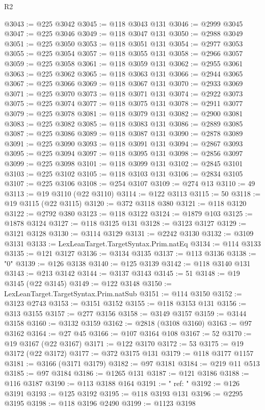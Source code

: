 \begin{lexlean}{R2}
\begin{coremodule}
@3043 := @225 @3042
@3045 := @118 @3043 @131
@3046 := @2999 @3045
@3047 := @225 @3046
@3049 := @118 @3047 @131
@3050 := @2988 @3049
@3051 := @225 @3050
@3053 := @118 @3051 @131
@3054 := @2977 @3053
@3055 := @225 @3054
@3057 := @118 @3055 @131
@3058 := @2966 @3057
@3059 := @225 @3058
@3061 := @118 @3059 @131
@3062 := @2955 @3061
@3063 := @225 @3062
@3065 := @118 @3063 @131
@3066 := @2944 @3065
@3067 := @225 @3066
@3069 := @118 @3067 @131
@3070 := @2933 @3069
@3071 := @225 @3070
@3073 := @118 @3071 @131
@3074 := @2922 @3073
@3075 := @225 @3074
@3077 := @118 @3075 @131
@3078 := @2911 @3077
@3079 := @225 @3078
@3081 := @118 @3079 @131
@3082 := @2900 @3081
@3083 := @225 @3082
@3085 := @118 @3083 @131
@3086 := @2889 @3085
@3087 := @225 @3086
@3089 := @118 @3087 @131
@3090 := @2878 @3089
@3091 := @225 @3090
@3093 := @118 @3091 @131
@3094 := @2867 @3093
@3095 := @225 @3094
@3097 := @118 @3095 @131
@3098 := @2856 @3097
@3099 := @225 @3098
@3101 := @118 @3099 @131
@3102 := @2845 @3101
@3103 := @225 @3102
@3105 := @118 @3103 @131
@3106 := @2834 @3105
@3107 := @225 @3106
@3108 := @254 @3107
@3109 := @274 @13
@3110 := 49
@3113 := @19 @3110 (@22 @3110)
@3114 := @122 @3113
@3115 := 50
@3118 := @19 @3115 (@22 @3115)
@3120 := @372 @3118 @380
@3121 := @118 @3120
@3122 := @2792 @380
@3123 := @118 @3122
@3124 := @1879 @103
@3125 := @1878 @3124
@3127 := @118 @3125 @131
@3128 := @3123 @3127
@3129 := @3121 @3128
@3130 := @3114 @3129
@3131 := @2242 @3130
@3132 := @3109 @3131
@3133 := LexLeanTarget.TargetSyntax.Prim.natEq
@3134 := @114 @3133
@3135 := @121 @3127
@3136 := @3134 @3135
@3137 := @113 @3136
@3138 := "0"
@3139 := @126 @3138
@3140 := @125 @3139
@3142 := @118 @3140 @131
@3143 := @213 @3142
@3144 := @3137 @3143
@3145 := 51
@3148 := @19 @3145 (@22 @3145)
@3149 := @122 @3148
@3150 := LexLeanTarget.TargetSyntax.Prim.natSub
@3151 := @114 @3150
@3152 := @3123 @2743
@3153 := @3151 @3152
@3155 := @118 @3153 @131
@3156 := @313 @3155
@3157 := @277 @3156
@3158 := @3149 @3157
@3159 := @3144 @3158
@3160 := @3132 @3159
@3162 := @2818 (@3108 @3160)
@3163 := @97 @3162
@3164 := @27 @45
@3166 := @107 @3164 @108
@3167 := 52
@3170 := @19 @3167 (@22 @3167)
@3171 := @122 @3170
@3172 := 53
@3175 := @19 @3172 (@22 @3172)
@3177 := @372 @3175 @131
@3179 := @118 @3177 @1157
@3181 := @3166 (@3171 @3179)
@3182 := @97 @3181
@3184 := @219 @11 @513
@3185 := @97 @3184
@3186 := @1265 @131
@3187 := @121 @3186
@3188 := @116 @3187
@3190 := @113 @3188 @164
@3191 := "          ref: "
@3192 := @126 @3191
@3193 := @125 @3192
@3195 := @118 @3193 @131
@3196 := @2295 @3195
@3198 := @118 @3196 @2490
@3199 := @1123 @3198

\end{coremodule}
\end{lexlean}
